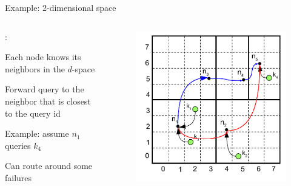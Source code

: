 \begin{frame}{Example: 2-dimensional space}

\begin{columns}
\begin{column}{0.5\textwidth}
:\\
\BI
\item Each node knows its neighbors in the $d$-space
\item Forward query to the neighbor that is closest to the query id
\item Example: assume $n_1$ queries $k_4$
\item Can route around some failures
\EI
\end{column}
\begin{column}{0.5\textwidth}
\begin{figure}
	\includegraphics[width=1.0\textwidth]{figs/10/can6}
\end{figure}
\end{column}
\end{columns}
		
\end{frame}	

